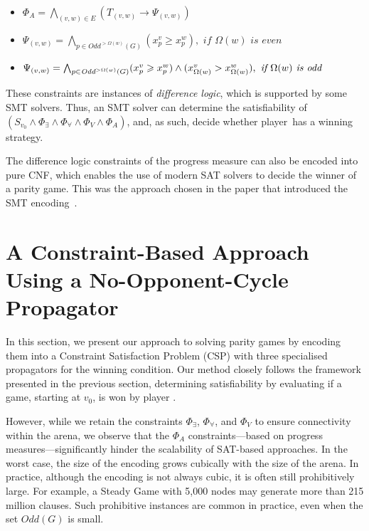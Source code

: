 \documentclass[letterpaper]{article} %
\begin{document}
\begin{itemize}
\item $\Phi_A = \bigwedge_{(v,w) \in E} \left(T_{(v,w)} \rightarrow \Psi_{(v,w)}\right)$
\item $\Psi_{(v,w)} = \bigwedge_{p \in \textit{Odd}^{>\Omega(w)}(G)} (x_p^v \geqslant x_p^w), \textit{ if } \Omega(w) \textit{ is even}$
\item $\Psi_{(v,w)} = \bigwedge_{p \in \textit{Odd}^{>\Omega(w)}(G)} (x_p^v \geqslant x_p^w) \land \\
(x_{\Omega(w)}^v > x_{\Omega(w)}^w), \textit{ if } \Omega(w) \textit{ is odd}$
\end{itemize}

These constraints are instances of {\em difference logic}, which is supported by some SMT solvers. Thus, an SMT solver can determine the satisfiability of~$(S_{v_0} \wedge \Phi_{\exists} \wedge \Phi_{\forall} \wedge \Phi_V \wedge \Phi_A)$, and, as such, decide whether player~\even has a winning strategy.

The difference logic constraints of the progress measure can also be encoded into pure CNF, which enables the use of modern SAT solvers to decide the winner of a parity game. This was the approach chosen in the paper that introduced the SMT encoding~\cite{Heljanko:2012}. 

\section{A Constraint-Based Approach Using a No-Opponent-Cycle Propagator}

In this section, we present our approach to solving parity games by encoding them into a Constraint Satisfaction Problem (CSP) with three specialised propagators for the winning condition. Our method closely follows the framework presented in the previous section, determining satisfiability by evaluating if a game, starting at $v_0$, is won by player \even.

However, while we retain the constraints $\Phi_\exists$, $\Phi_\forall$, and $\Phi_V$ to ensure connectivity within the arena, we observe that the $\Phi_A$ constraints—based on progress measures—significantly hinder the scalability of SAT-based approaches. 
In the worst case, the size of the encoding grows cubically with the size of the arena. In practice, although the encoding is not always cubic, it is often still prohibitively large. For example, a Steady Game with 5,000 nodes may generate more than 215 million clauses. Such prohibitive instances are common in practice, even when the set $\textit{Odd}(G)$ is small.
\end{document}
